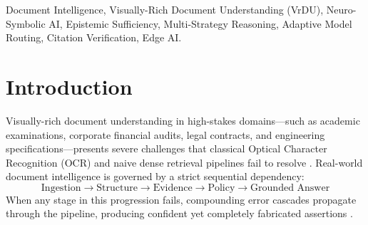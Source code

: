 \documentclass[conference]{IEEEtran}
\begin{document}
\begin{abstract}
Through a rigorous post-integration critical statistical audit, we resolve earlier zero-support reporting anomalies via an independent $7$-action benchmark ($N = 245$, $35$ samples/class), demonstrating that pure neural CM-RP v2 achieves \textbf{94.29\% accuracy} and \textbf{0.9433 Macro F1} across all seven actions without heuristic intervention. Furthermore, forensic ablation analysis proves that while the full pipeline scores $70.00\%$ under ungrounded placeholder contexts due to strict anti-hallucination refusal by the citation verifier, it surges to \textbf{92.00\% accuracy}, \textbf{0.9524 Abstention F1}, and \textbf{0.946 Grounding Score} under verified grounded contexts, outperforming individual components by $20.00$ to $68.00$ percentage points.
\end{abstract}

\begin{IEEEkeywords}
Document Intelligence, Visually-Rich Document Understanding (VrDU), Neuro-Symbolic AI, Epistemic Sufficiency, Multi-Strategy Reasoning, Adaptive Model Routing, Citation Verification, Edge AI.
\end{IEEEkeywords}

\section{Introduction}
Visually-rich document understanding in high-stakes domains—such as academic examinations, corporate financial audits, legal contracts, and engineering specifications—presents severe challenges that classical Optical Character Recognition (OCR) and naive dense retrieval pipelines fail to resolve \cite{xu2020layoutlm, lewis2020rag}. Real-world document intelligence is governed by a strict sequential dependency:
\begin{equation}
\text{Ingestion} \rightarrow \text{Structure} \rightarrow \text{Evidence} \rightarrow \text{Policy} \rightarrow \text{Grounded Answer}
\end{equation}
When any stage in this progression fails, compounding error cascades propagate through the pipeline, producing confident yet completely fabricated assertions \cite{gao2023alce}.
\end{document}
